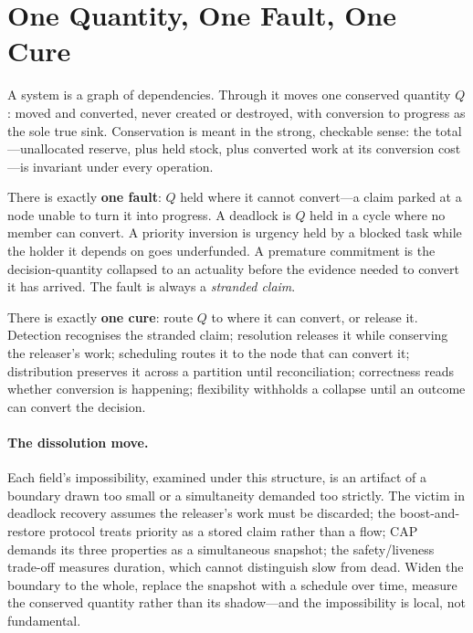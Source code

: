 \documentclass[11pt]{article}
\begin{document}
\section{One Quantity, One Fault, One Cure}
\label{sec:sharpening}

A system is a graph of dependencies. Through it moves one conserved
quantity $Q$: moved and converted, never created or destroyed, with
conversion to progress as the sole true sink. Conservation is meant in
the strong, checkable sense: the total---unallocated reserve, plus held
stock, plus converted work at its conversion cost---is invariant under
every operation.

There is exactly \textbf{one fault}: $Q$ held where it cannot
convert---a claim parked at a node unable to turn it into progress. A
deadlock is $Q$ held in a cycle where no member can convert. A priority
inversion is urgency held by a blocked task while the holder it depends
on goes underfunded. A premature commitment is the decision-quantity
collapsed to an actuality before the evidence needed to convert it has
arrived. The fault is always a \emph{stranded claim}.

There is exactly \textbf{one cure}: route $Q$ to where it can convert,
or release it. Detection recognises the stranded claim; resolution
releases it while conserving the releaser's work; scheduling routes it
to the node that can convert it; distribution preserves it across a
partition until reconciliation; correctness reads whether conversion is
happening; flexibility withholds a collapse until an outcome can convert
the decision.

\paragraph{The dissolution move.} Each field's impossibility, examined
under this structure, is an artifact of a boundary drawn too small or a
simultaneity demanded too strictly. The victim in deadlock recovery
assumes the releaser's work must be discarded; the boost-and-restore
protocol treats priority as a stored claim rather than a flow; CAP
demands its three properties as a simultaneous snapshot; the
safety/liveness trade-off measures duration, which cannot distinguish
slow from dead. Widen the boundary to the whole, replace the snapshot
with a schedule over time, measure the conserved quantity rather than
its shadow---and the impossibility is local, not fundamental.
\end{document}
